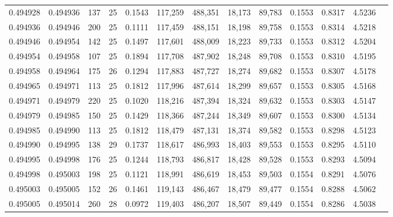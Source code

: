 \begin{tabular}{rrrrrrrrrrrrr}
0.494928 & 0.494936 & 137 &  25 &                                     0.1543 & 117,259 & 488,351 &  18,173 &  89,783 & 0.1553 & 0.8317 & 4.5236 \\
0.494936 & 0.494946 & 200 &  25 &                                     0.1111 & 117,459 & 488,151 &  18,198 &  89,758 & 0.1553 & 0.8314 & 4.5218 \\
0.494946 & 0.494954 & 142 &  25 &                                     0.1497 & 117,601 & 488,009 &  18,223 &  89,733 & 0.1553 & 0.8312 & 4.5204 \\
0.494954 & 0.494958 & 107 &  25 &                                     0.1894 & 117,708 & 487,902 &  18,248 &  89,708 & 0.1553 & 0.8310 & 4.5195 \\
0.494958 & 0.494964 & 175 &  26 &                                     0.1294 & 117,883 & 487,727 &  18,274 &  89,682 & 0.1553 & 0.8307 & 4.5178 \\
0.494965 & 0.494971 & 113 &  25 &                                     0.1812 & 117,996 & 487,614 &  18,299 &  89,657 & 0.1553 & 0.8305 & 4.5168 \\
0.494971 & 0.494979 & 220 &  25 &                                     0.1020 & 118,216 & 487,394 &  18,324 &  89,632 & 0.1553 & 0.8303 & 4.5147 \\
0.494979 & 0.494985 & 150 &  25 &                                     0.1429 & 118,366 & 487,244 &  18,349 &  89,607 & 0.1553 & 0.8300 & 4.5134 \\
0.494985 & 0.494990 & 113 &  25 &                                     0.1812 & 118,479 & 487,131 &  18,374 &  89,582 & 0.1553 & 0.8298 & 4.5123 \\
0.494990 & 0.494995 & 138 &  29 &                                     0.1737 & 118,617 & 486,993 &  18,403 &  89,553 & 0.1553 & 0.8295 & 4.5110 \\
0.494995 & 0.494998 & 176 &  25 &                                     0.1244 & 118,793 & 486,817 &  18,428 &  89,528 & 0.1553 & 0.8293 & 4.5094 \\
0.494998 & 0.495003 & 198 &  25 &                                     0.1121 & 118,991 & 486,619 &  18,453 &  89,503 & 0.1554 & 0.8291 & 4.5076 \\
0.495003 & 0.495005 & 152 &  26 &                                     0.1461 & 119,143 & 486,467 &  18,479 &  89,477 & 0.1554 & 0.8288 & 4.5062 \\
0.495005 & 0.495014 & 260 &  28 &                                     0.0972 & 119,403 & 486,207 &  18,507 &  89,449 & 0.1554 & 0.8286 & 4.5038 \\

\end{tabular}

